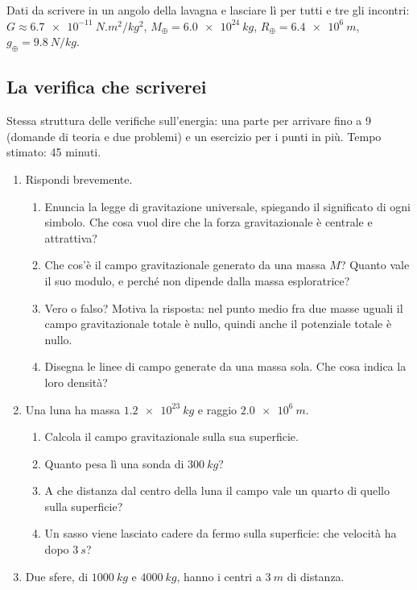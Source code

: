 \documentclass[11pt]{report}
\begin{document}
Dati da scrivere in un angolo della lavagna e lasciare lì per tutti e tre
gli incontri: $G \approx \SI{6.7e-11}{N.m^2/kg^2}$,
$M_\oplus = \SI{6.0e24}{kg}$, $R_\oplus = \SI{6.4e6}{m}$,
$g_\oplus = \SI{9.8}{N/kg}$.

\subsection*{La verifica che scriverei}

Stessa struttura delle verifiche sull'energia: una parte per arrivare
fino a 9 (domande di teoria e due problemi) e un esercizio per i punti in
più. Tempo stimato: 45 minuti.

\begin{enumerate}
  \item Rispondi brevemente.
  \begin{enumerate}[label=\alph*)]
    \item Enuncia la legge di gravitazione universale, spiegando il
    significato di ogni simbolo. Che cosa vuol dire che la forza
    gravitazionale è centrale e attrattiva?
    \item Che cos'è il campo gravitazionale generato da una massa $M$?
    Quanto vale il suo modulo, e perché non dipende dalla massa
    esploratrice?
    \item Vero o falso? Motiva la risposta: nel punto medio fra due masse
    uguali il campo gravitazionale totale è nullo, quindi anche il
    potenziale totale è nullo.
    \item Disegna le linee di campo generate da una massa sola. Che cosa
    indica la loro densità?
  \end{enumerate}
  \item Una luna ha massa $\SI{1.2e23}{kg}$ e raggio $\SI{2.0e6}{m}$.
  \begin{enumerate}[label=\alph*)]
    \item Calcola il campo gravitazionale sulla sua superficie.
    \item Quanto pesa lì una sonda di $\SI{300}{kg}$?
    \item A che distanza dal centro della luna il campo vale un quarto di
    quello sulla superficie?
    \item Un sasso viene lasciato cadere da fermo sulla superficie: che
    velocità ha dopo $\SI{3}{s}$?
  \end{enumerate}
  \item Due sfere, di $\SI{1000}{kg}$ e $\SI{4000}{kg}$, hanno i centri a
  $\SI{3}{m}$ di distanza.

\end{enumerate}
\end{document}
